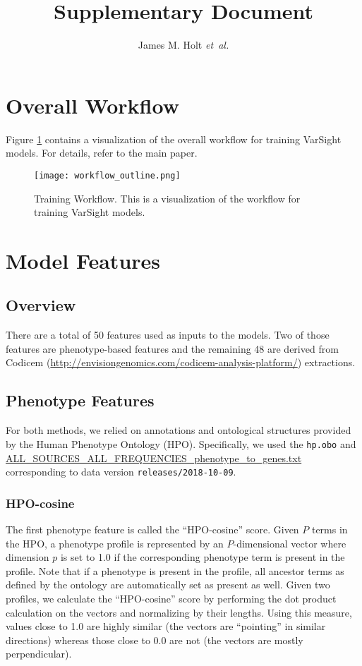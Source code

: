 \documentclass{article}
\begin{document}
\title{Supplementary Document}
\author{James M. Holt {\it et~al.}}

\maketitle

\tableofcontents

\pagebreak
\section{Overall Workflow}
Figure \ref{fig:workflow_outline} contains a visualization of the overall workflow for training VarSight models.  For details, refer to the main paper.

\begin{figure}[!b]
\centering
\texttt{[image: workflow\_outline.png]}
\caption{Training Workflow. This is a visualization of the workflow for training VarSight models.}
\label{fig:workflow_outline}
\end{figure}

\section{Model Features}
\subsection{Overview}
There are a total of 50 features used as inputs to the models.  Two of those features are phenotype-based features and the remaining 48 are derived from Codicem (\url{http://envisiongenomics.com/codicem-analysis-platform/}) extractions.

\subsection{Phenotype Features}
For both methods, we relied on annotations and ontological structures provided by the Human Phenotype Ontology (HPO).  Specifically, we used the \texttt{hp.obo} and \url{ALL_SOURCES_ALL_FREQUENCIES_phenotype_to_genes.txt} corresponding to data version \texttt{releases/2018-10-09}.

\subsubsection{HPO-cosine}
The first phenotype feature is called the ``HPO-cosine'' score.  Given $P$ terms in the HPO, a phenotype profile is represented by an $P$-dimensional vector where dimension $p$ is set to 1.0 if the corresponding phenotype term is present in the profile.  Note that if a phenotype is present in the profile, all ancestor terms as defined by the ontology are automatically set as present as well.  Given two profiles, we calculate the ``HPO-cosine'' score by performing the dot product calculation on the vectors and normalizing by their lengths.  Using this measure, values close to 1.0 are highly similar (the vectors are ``pointing'' in similar directions) whereas those close to 0.0 are not (the vectors are mostly perpendicular).
\end{document}
